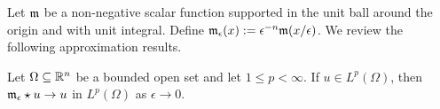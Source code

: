\documentclass[12pt,a4paper]{article}
\begin{document}





Let ${\mathfrak m}$ be a non-negative scalar function supported in the unit ball around the origin and with unit integral.
Define ${\mathfrak m}_{\epsilon}(x) := \epsilon^{-n} {\mathfrak m}(x/\epsilon)$. We review the following approximation results.

\begin{lemma}
    Let $\Omega \subseteq {\mathbb R}^{n}$ be a bounded open set and let $1 \leq p < \infty$. 
    If $u \in L^{p}(\Omega)$, then ${\mathfrak m}_{\epsilon} \star u \rightarrow u$ in $L^{p}(\Omega)$ as $\epsilon \rightarrow 0$.
\end{lemma}

\end{document}
